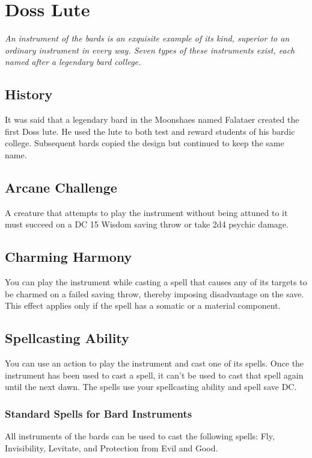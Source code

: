 \ItemSubCategory{}

\chapter*{Doss Lute}

\noindent\textit{An instrument of the bards is an exquisite example of its kind, superior to an ordinary instrument in every way. Seven types of these instruments exist, each named after a legendary bard college.}

\section*{History}
It was said that a legendary bard in the Moonshaes named Falataer created the first Doss lute. He used the lute to both test and reward students of his bardic college. Subsequent bards copied the design but continued to keep the same name.

\section*{Arcane Challenge}
A creature that attempts to play the instrument without being attuned to it must succeed on a DC 15 Wisdom saving throw or take 2d4 psychic damage.

\section*{Charming Harmony}
You can play the instrument while casting a spell that causes any of its targets to be charmed on a failed saving throw, thereby imposing disadvantage on the save. This effect applies only if the spell has a somatic or a material component.

\section*{Spellcasting Ability}
You can use an action to play the instrument and cast one of its spells. Once the instrument has been used to cast a spell, it can't be used to cast that spell again until the next dawn. The spells use your spellcasting ability and spell save DC.
\subsection*{Standard Spells for Bard Instruments}
All instruments of the bards can be used to cast the following spells: Fly, Invisibility, Levitate, and Protection from Evil and Good.
